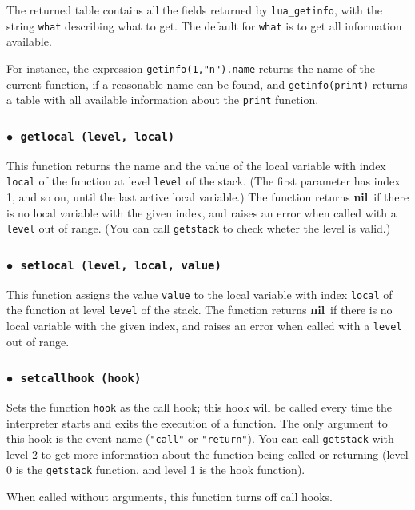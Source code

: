 \documentclass[11pt]{article}
\newcommand{\T}[1]{{\tt #1}}
\newcommand{\nil}{{\bf nil}}
\newcommand{\Deffunc}[1]{\index{#1}}
\newcommand{\ff}{$\bullet$\ }
\begin{document}
The returned table contains all the fields returned by \verb|lua_getinfo|,
with the string \verb|what| describing what to get.
The default for \verb|what| is to get all information available.

For instance, the expression \verb|getinfo(1,"n").name| returns
the name of the current function, if a reasonable name can be found,
and \verb|getinfo(print)| returns a table with all available information
about the \verb|print| function.


\subsubsection*{\ff \T{getlocal (level, local)}}\Deffunc{getlocal}

This function returns the name and the value of the local variable
with index \verb|local| of the function at level \verb|level| of the stack.
(The first parameter has index 1, and so on,
until the last active local variable.)
The function returns \nil\ if there is no local
variable with the given index,
and raises an error when called with a \verb|level| out of range.
(You can call \verb|getstack| to check wheter the level is valid.)

\subsubsection*{\ff \T{setlocal (level, local, value)}}\Deffunc{setlocal}

This function assigns the value \verb|value| to the local variable
with index \verb|local| of the function at level \verb|level| of the stack.
The function returns \nil\ if there is no local
variable with the given index,
and raises an error when called with a \verb|level| out of range.

\subsubsection*{\ff \T{setcallhook (hook)}}\Deffunc{setcallhook}

Sets the function \verb|hook| as the call hook;
this hook will be called every time the interpreter starts and
exits the execution of a function.
The only argument to this hook is the event name (\verb|"call"| or
\verb|"return"|).
You can call \verb|getstack| with level 2 to get more information about
the function being called or returning
(level 0 is the \verb|getstack| function,
and level 1 is the hook function).

When called without arguments,
this function turns off call hooks.
\end{document}
